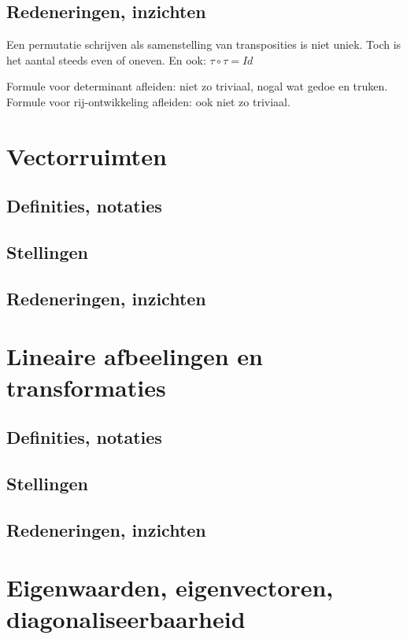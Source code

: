\documentclass{article}
\begin{document}
\subsection{Redeneringen, inzichten}

Een permutatie schrijven als samenstelling van transposities is niet uniek. Toch is het aantal steeds even of oneven. En ook: $\tau \circ \tau = Id$

Formule voor determinant afleiden: niet zo triviaal, nogal wat gedoe en truken. 
Formule voor rij-ontwikkeling afleiden: ook niet zo triviaal. 


\section{Vectorruimten}

\subsection{Definities, notaties}

\subsection{Stellingen}

\subsection{Redeneringen, inzichten}


\section{Lineaire afbeelingen en transformaties}

\subsection{Definities, notaties}

\subsection{Stellingen}

\subsection{Redeneringen, inzichten}




\section{Eigenwaarden, eigenvectoren, diagonaliseerbaarheid}
\end{document}
